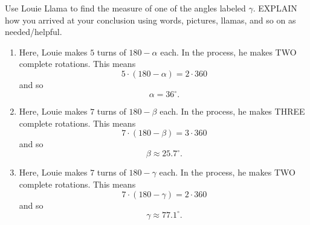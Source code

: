 \documentclass[nooutcomes,noauthor,hints]{ximera}
\begin{document}
\begin{question}
\begin{enumerate}
\begin{center}
\begin{tikzpicture}
      \end{tikzpicture}
    \end{center}
    Use Louie Llama to find the measure of one of the angles labeled
    $\gamma$. EXPLAIN how you arrived at your conclusion using words,
    pictures, llamas, and so on as needed/helpful.
  \end{enumerate}
  \begin{freeResponse}
    \begin{enumerate}
    \item Here, Louie makes $5$ turns of $180-\alpha$ each. In
      the process, he makes TWO complete rotations. This means
      \[
      5\cdot (180-\alpha) = 2\cdot 360
      \]
      and so
      \[
      \alpha= 36^\circ.
      \]
    \item Here, Louie makes $7$ turns of $180-\beta$ each. In
      the process, he makes THREE complete rotations. This means
      \[
      7\cdot (180-\beta) = 3\cdot 360
      \]
      and so
      \[
      \beta\approx 25.7^\circ.
      \]
    \item Here, Louie makes $7$ turns of $180-\gamma$ each. In
      the process, he makes TWO complete rotations. This means
      \[
      7\cdot (180-\gamma) = 2\cdot 360
      \]
      and so
      \[
      \gamma\approx 77.1^\circ.
      \]
    \end{enumerate}
  \end{freeResponse}
\end{question}



        
\end{document}

